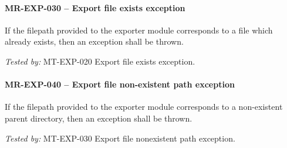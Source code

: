 \paragraph{MR-EXP-030 -- Export file exists exception}
If the filepath provided to the exporter module corresponds to
a file which already exists, then an exception shall be thrown.

\textit{Tested by: } MT-EXP-020 Export file exists exception.

\paragraph{MR-EXP-040 -- Export file non-existent path exception}
If the filepath provided to the exporter module corresponds
to a non-existent parent directory, then an exception shall be thrown.

\textit{Tested by: } MT-EXP-030 Export file nonexistent path exception.
